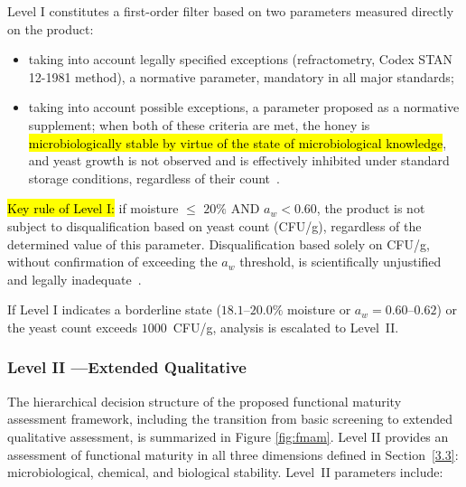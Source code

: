 \documentclass[foods,review,accept,pdftex,moreauthors]{Definitions/mdpi}
\begin{document}
{Level I constitutes a first-order filter based on two parameters
measured directly on the product:

\begin{itemize}
    \item {} taking into account
          legally specified exceptions (refractometry,
          Codex STAN 12-1981 method), a normative parameter,
          mandatory in all major standards;
    \item {} taking into
          account possible exceptions, a parameter proposed as
          a normative supplement; when both of these criteria
          are met, the honey is \hl{microbiologically stable
          by virtue of the state of microbiological knowledge},
          and yeast growth is  {not observed and is effectively inhibited under standard storage conditions,}
          regardless of their count~\cite{ruegg1981,waaw2006}.
\end{itemize}

\hl{Key rule of Level I:} if moisture $\leq$ $20\%$
\textsc{AND} $a_w < 0.60$, the product is not subject to
disqualification based on yeast count (CFU/g), regardless of the
determined value of this parameter. Disqualification based solely
on CFU/g, without confirmation of exceeding the $a_w$ threshold,
is scientifically unjustified and legally
inadequate~\cite{codex_stan12,eudir2001110}.

If Level I indicates a borderline state ($18.1$--$20.0\%$
moisture or $a_w = 0.60$--$0.62$) or the yeast count exceeds
$1000$~CFU/g, analysis is escalated to Level~II.

\subsubsection{Level II ---Extended Qualitative}

{The hierarchical decision structure of the proposed functional maturity assessment framework, including the transition from basic screening to extended qualitative assessment, is summarized in Figure \ref{fig:fmam}}.
Level II provides an assessment of functional maturity in all
three dimensions defined in Section~\ref{3.3}: microbiological, chemical,
and biological stability. Level~II parameters include:

}
\end{document}
